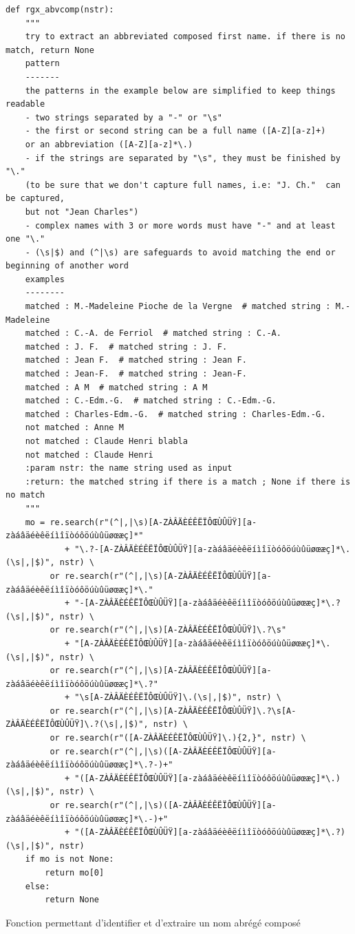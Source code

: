 \clearpage
\begin{multipageminted}
	\begin{verbatim}
def rgx_abvcomp(nstr):
	"""
	try to extract an abbreviated composed first name. if there is no match, return None
	pattern
	-------
	the patterns in the example below are simplified to keep things readable
	- two strings separated by a "-" or "\s"
	- the first or second string can be a full name ([A-Z][a-z]+)
	or an abbreviation ([A-Z][a-z]*\.)
	- if the strings are separated by "\s", they must be finished by "\."
	(to be sure that we don't capture full names, i.e: "J. Ch."  can be captured,
	but not "Jean Charles")
	- complex names with 3 or more words must have "-" and at least one "\."
	- (\s|$) and (^|\s) are safeguards to avoid matching the end or beginning of another word
	examples
	--------
	matched : M.-Madeleine Pioche de la Vergne  # matched string : M.-Madeleine
	matched : C.-A. de Ferriol  # matched string : C.-A.
	matched : J. F.  # matched string : J. F.
	matched : Jean F.  # matched string : Jean F.
	matched : Jean-F.  # matched string : Jean-F.
	matched : A M  # matched string : A M
	matched : C.-Edm.-G.  # matched string : C.-Edm.-G.
	matched : Charles-Edm.-G.  # matched string : Charles-Edm.-G.
	not matched : Anne M
	not matched : Claude Henri blabla
	not matched : Claude Henri
	:param nstr: the name string used as input
	:return: the matched string if there is a match ; None if there is no match
	"""
	mo = re.search(r"(^|,|\s)[A-ZÀÂÄÈÉÊËÏÔŒÙÛÜŸ][a-zàáâäéèêëíìîïòóôöúùûüøœæç]*"
			+ "\.?-[A-ZÀÂÄÈÉÊËÏÔŒÙÛÜŸ][a-zàáâäéèêëíìîïòóôöúùûüøœæç]*\.(\s|,|$)", nstr) \
		 or re.search(r"(^|,|\s)[A-ZÀÂÄÈÉÊËÏÔŒÙÛÜŸ][a-zàáâäéèêëíìîïòóôöúùûüøœæç]*\."
			+ "-[A-ZÀÂÄÈÉÊËÏÔŒÙÛÜŸ][a-zàáâäéèêëíìîïòóôöúùûüøœæç]*\.?(\s|,|$)", nstr) \
		 or re.search(r"(^|,|\s)[A-ZÀÂÄÈÉÊËÏÔŒÙÛÜŸ]\.?\s"
			+ "[A-ZÀÂÄÈÉÊËÏÔŒÙÛÜŸ][a-zàáâäéèêëíìîïòóôöúùûüøœæç]*\.(\s|,|$)", nstr) \
		 or re.search(r"(^|,|\s)[A-ZÀÂÄÈÉÊËÏÔŒÙÛÜŸ][a-zàáâäéèêëíìîïòóôöúùûüøœæç]*\.?"
		    + "\s[A-ZÀÂÄÈÉÊËÏÔŒÙÛÜŸ]\.(\s|,|$)", nstr) \
		 or re.search(r"(^|,|\s)[A-ZÀÂÄÈÉÊËÏÔŒÙÛÜŸ]\.?\s[A-ZÀÂÄÈÉÊËÏÔŒÙÛÜŸ]\.?(\s|,|$)", nstr) \
		 or re.search(r"([A-ZÀÂÄÈÉÊËÏÔŒÙÛÜŸ]\.){2,}", nstr) \
		 or re.search(r"(^|,|\s)([A-ZÀÂÄÈÉÊËÏÔŒÙÛÜŸ][a-zàáâäéèêëíìîïòóôöúùûüøœæç]*\.?-)+"
			+ "([A-ZÀÂÄÈÉÊËÏÔŒÙÛÜŸ][a-zàáâäéèêëíìîïòóôöúùûüøœæç]*\.)(\s|,|$)", nstr) \
		 or re.search(r"(^|,|\s)([A-ZÀÂÄÈÉÊËÏÔŒÙÛÜŸ][a-zàáâäéèêëíìîïòóôöúùûüøœæç]*\.-)+"
		  	+ "([A-ZÀÂÄÈÉÊËÏÔŒÙÛÜŸ][a-zàáâäéèêëíìîïòóôöúùûüøœæç]*\.?)(\s|,|$)", nstr)
	if mo is not None:
		return mo[0]
	else:
		return None
	\end{verbatim}
	\caption{Fonction permettant d'identifier et d'extraire un nom abrégé composé}
	\label{appendix:rgxabvcomp}
\end{multipageminted}
\clearpage

